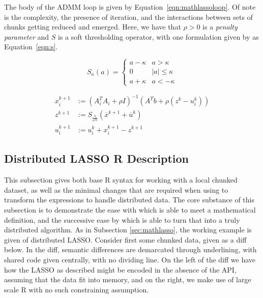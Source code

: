 \documentclass[letterpaper, inpress]{jds} %
\begin{document}
The body of the ADMM loop is given by Equation~\ref{eqn:mathlassoloop}.
Of note is the complexity, the presence of iteration, and the interactions between sets of chunks getting reduced and emerged.
Here, we have that $\rho > 0$ is a \textit{penalty parameter} and $S$ is a soft thresholding operator, with one formulation given by \citet{boyd2011} as Equation~\ref{eqn:s}.

\begin{equation}\label{eqn:s}
S_\kappa(a) = \left\{ \begin{array}{cl}
a - \kappa & a > \kappa \\
0 & |a| \leq \kappa \\
a + \kappa & a < -\kappa
\end{array} \right.
\end{equation}

\begin{equation}\label{eqn:mathlassoloop}
    \begin{aligned}
        x_i^{k+1} &:= (A_i^T A_i + \rho I)^{-1}(A^T b + \rho(z^k - u_i^k))\\
        z^{k+1} &:= S_\frac{\lambda}{\rho N} (\overline{x}^{k+1} + \overline{u}^k) \\
        u_i^{k+1} &:= u_i^k + x_i^{k+1} - z^{k+1}
    \end{aligned} 
\end{equation}

\subsection{Distributed LASSO R Description}\label{sec:rlasso}

This subsection gives both base R syntax for working with a local chunked dataset, as well as the minimal changes that are required when using  to transform the expressions to handle distributed data.
The core substance of this subsection is to demonstrate the ease with which  is able to meet a mathematical definition, and the successive ease by which  is able to turn that into a truly distributed algorithm.
As in Subsection \ref{sec:mathlasso}, the working example is given of distributed LASSO.
Consider first some chunked data, given as a diff below.
In the diff, semantic differences are demarcated through underlining, with shared code given centrally, with no dividing line.
On the left of the diff we have how the LASSO as described might be encoded in the absence of the API, assuming that the data fit into memory, and on the right, we make use of large scale R with no such constraining assumption.
\end{document}
